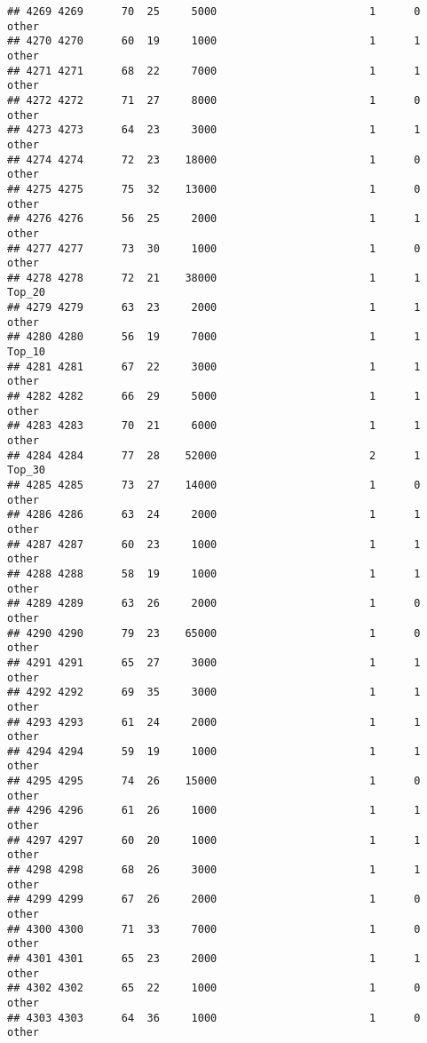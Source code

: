 \documentclass[
]{article}
\begin{document}
\begin{verbatim}
## 4269 4269      70  25     5000                        1      0    other
## 4270 4270      60  19     1000                        1      1    other
## 4271 4271      68  22     7000                        1      1    other
## 4272 4272      71  27     8000                        1      0    other
## 4273 4273      64  23     3000                        1      1    other
## 4274 4274      72  23    18000                        1      0    other
## 4275 4275      75  32    13000                        1      0    other
## 4276 4276      56  25     2000                        1      1    other
## 4277 4277      73  30     1000                        1      0    other
## 4278 4278      72  21    38000                        1      1   Top_20
## 4279 4279      63  23     2000                        1      1    other
## 4280 4280      56  19     7000                        1      1   Top_10
## 4281 4281      67  22     3000                        1      1    other
## 4282 4282      66  29     5000                        1      1    other
## 4283 4283      70  21     6000                        1      1    other
## 4284 4284      77  28    52000                        2      1   Top_30
## 4285 4285      73  27    14000                        1      0    other
## 4286 4286      63  24     2000                        1      1    other
## 4287 4287      60  23     1000                        1      1    other
## 4288 4288      58  19     1000                        1      1    other
## 4289 4289      63  26     2000                        1      0    other
## 4290 4290      79  23    65000                        1      0    other
## 4291 4291      65  27     3000                        1      1    other
## 4292 4292      69  35     3000                        1      1    other
## 4293 4293      61  24     2000                        1      1    other
## 4294 4294      59  19     1000                        1      1    other
## 4295 4295      74  26    15000                        1      0    other
## 4296 4296      61  26     1000                        1      1    other
## 4297 4297      60  20     1000                        1      1    other
## 4298 4298      68  26     3000                        1      1    other
## 4299 4299      67  26     2000                        1      0    other
## 4300 4300      71  33     7000                        1      0    other
## 4301 4301      65  23     2000                        1      1    other
## 4302 4302      65  22     1000                        1      0    other
## 4303 4303      64  36     1000                        1      0    other

\end{verbatim}
\end{document}
